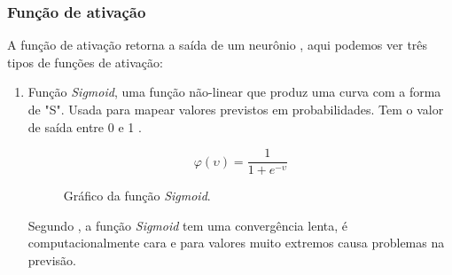 \subsubsection*{Função de ativação}

A função de ativação retorna a saída de um neurônio \cite{haykin1999neural}, aqui podemos ver três tipos de funções de ativação:

\begin{enumerate}
	\item Função \textit{Sigmoid}, uma função não-linear que produz uma curva com a forma de "S". Usada para mapear valores previstos em probabilidades. Tem o valor de saída entre 0 e 1 \cite{gharat2019what}.
	\begin{figure}[H]
	\caption{Gráfico da função \textit{Sigmoid}.}
	\begin{center}
		\begin{minipage}{0.45\textwidth}
			$$\varphi(\upsilon) = \frac{1}{1 + e^{-\upsilon}}$$
		\end{minipage}
		\hfill
		\begin{minipage}{0.45\textwidth}
		\end{minipage}
	\end{center}
	\label{fig:grafico_sigmoid}
	\end{figure}
	Segundo , a função \textit{Sigmoid} tem uma convergência lenta, é computacionalmente cara e para valores muito extremos causa problemas na previsão.


\end{enumerate}
